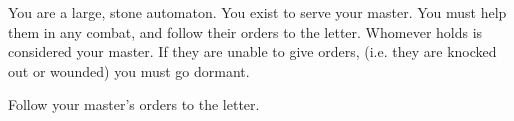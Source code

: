 \documentclass[char]{guildcamp2}
\begin{document}
\name{\cGolem{}}

You are a large, stone automaton. You exist to serve your master. You must help them in any combat, and follow their orders to the letter. Whomever holds \iGolemControlRod{} is considered your master. If they are unable to give orders, (i.e. they are knocked out or wounded) you must go dormant.	
	
	\begin{itemz}[Goals]
  \item Follow your master's orders to the letter.
\end{itemz}
\end{document}
